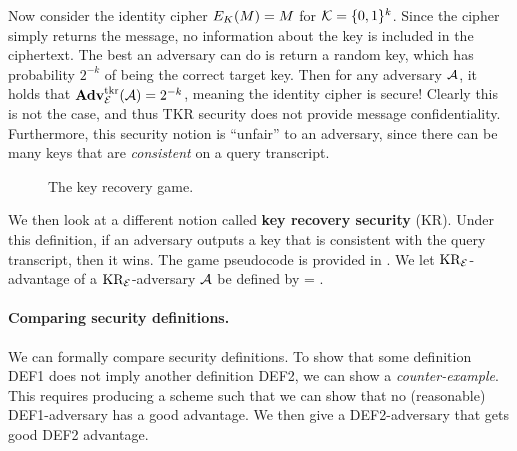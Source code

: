 Now consider the identity cipher $E_{K}(M) = M$ for ${\cal K}=\{0,1\}^k$. Since the cipher simply returns the message, no information about the key is included in the ciphertext. The best an adversary can do is return a random key, which has probability $2^{-k}$ of being the correct target key.
Then for any adversary ${\mathcal A}$, it holds that $\mathbf{Adv}^{\mathrm{tkr}}_{{\cal E}}({\mathcal A}) = 2^{-k}$, meaning the identity cipher is secure! Clearly this is not the case, and thus TKR security does not provide message confidentiality. Furthermore, this security notion is ``unfair'' to an adversary, since there can be many keys that are \textit{consistent} on a query transcript. 

\begin{figure}[p]
	\centering
	\caption{The key recovery game.}
	\label{fig:kr}
\end{figure}

We then look at a different notion called \textbf{key recovery security} (KR). Under this definition, if an adversary outputs a key that is consistent with the query transcript, then it wins. The game pseudocode is provided in . We let $\textnormal{KR}_{\cal E}$-advantage of a $\textnormal{KR}_{\cal E}$-adversary ${\mathcal A}$ be defined by 
\bnm
\AdvKR{\cipher}{\advA} = \Prob{\KR^\advA_\cipherE \Rightarrow\true}  \;.
\enm

\paragraph{Comparing security definitions.} We can formally compare security definitions. To show that some definition DEF1 does not imply another definition DEF2, we can show a \textit{counter-example}. This requires producing a scheme such that we can show that no (reasonable) DEF1-adversary has a good advantage. We then give a DEF2-adversary that gets good DEF2 advantage.

